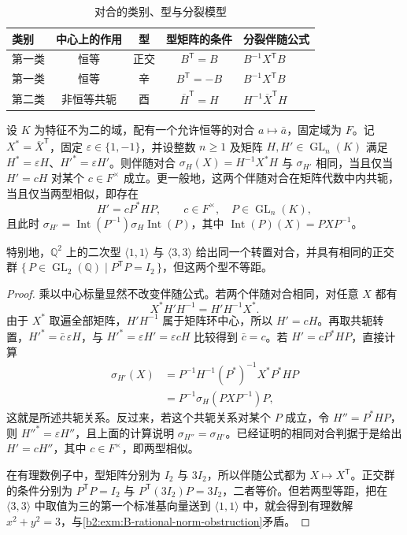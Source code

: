 \begin{table}[htbp]
	\centering
	\caption{对合的类别、型与分裂模型}
	\label{b2:tab:B-involution-kinds}
	\begin{tabular}{lcccl}
		\toprule
		类别 & 中心上的作用 & 型 & 型矩阵的条件 & 分裂伴随公式 \\
		\midrule
		第一类 & 恒等 & 正交 & \(B^{\mathsf T}=B\) & \(B^{-1}X^{\mathsf T}B\) \\
		第一类 & 恒等 & 辛 & \(B^{\mathsf T}=-B\) & \(B^{-1}X^{\mathsf T}B\) \\
		第二类 & 非恒等共轭 & 酉 & \(\overline H^{\mathsf T}=H\) & \(H^{-1}\overline X^{\mathsf T}H\) \\
		\bottomrule
	\end{tabular}
\end{table}

\begin{proposition}\label{b2:prop:B-similar-forms-adjoint}
	设 \(K\) 为特征不为二的域，配有一个允许恒等的对合 \(a\mapsto\bar a\)，固定域为 \(F\)。记 \(X^*=\overline X^{\mathsf T}\)，固定 \(\varepsilon\in\{1,-1\}\)，并设整数 \(n\ge1\) 及矩阵 \(H,H'\in\operatorname{GL}_n(K)\) 满足 \(H^*=\varepsilon H\)、\(H'^*=\varepsilon H'\)。则伴随对合 \(\sigma_H(X)=H^{-1}X^*H\) 与 \(\sigma_{H'}\) 相同，当且仅当 \(H'=cH\) 对某个 \(c\in F^\times\) 成立。更一般地，这两个伴随对合在矩阵代数中内共轭，当且仅当两型相似，即存在
	\[
		H'=cP^*HP,\qquad c\in F^\times,\quad P\in\operatorname{GL}_n(K),
	\]
	且此时 \(\sigma_{H'}=\operatorname{Int}(P^{-1})\sigma_H\operatorname{Int}(P)\)，其中 \(\operatorname{Int}(P)(X)=PXP^{-1}\)。

	特别地，\(\mathbb Q^2\) 上的二次型 \(\langle1,1\rangle\) 与 \(\langle3,3\rangle\) 给出同一个转置对合，并具有相同的正交群 \(\{\,P\in\operatorname{GL}_2(\mathbb Q)\mid P^{\mathsf T}P=I_2\,\}\)，但这两个型不等距。
\end{proposition}
\begin{proof}
	乘以中心标量显然不改变伴随公式。若两个伴随对合相同，对任意 \(X\) 都有
	\[
		X^*H'H^{-1}=H'H^{-1}X^*.
	\]
	由于 \(X^*\) 取遍全部矩阵，\(H'H^{-1}\) 属于矩阵环中心，所以 \(H'=cH\)。再取共轭转置，\(H'^*=\bar c\,\varepsilon H\)，与 \(H'^*=\varepsilon H'=\varepsilon cH\) 比较得到 \(\bar c=c\)。若 \(H'=cP^*HP\)，直接计算
	\[
		\begin{aligned}
			\sigma_{H'}(X) &=P^{-1}H^{-1}(P^*)^{-1}X^*P^*HP\\
			&=P^{-1}\sigma_H(PXP^{-1})P,
		\end{aligned}
	\]
	这就是所述共轭关系。反过来，若这个共轭关系对某个 \(P\) 成立，令 \(H''=P^*HP\)，则 \(H''^*=\varepsilon H''\)，且上面的计算说明 \(\sigma_{H''}=\sigma_{H'}\)。已经证明的相同对合判据于是给出 \(H'=cH''\)，其中 \(c\in F^\times\)，即两型相似。

	在有理数例子中，型矩阵分别为 \(I_2\) 与 \(3I_2\)，所以伴随公式都为 \(X\mapsto X^{\mathsf T}\)。正交群的条件分别为 \(P^{\mathsf T}P=I_2\) 与 \(P^{\mathsf T}(3I_2)P=3I_2\)，二者等价。但若两型等距，把在 \(\langle3,3\rangle\) 中取值为三的第一个标准基向量送到 \(\langle1,1\rangle\) 中，就会得到有理数解 \(x^2+y^2=3\)，与\cref{b2:exm:B-rational-norm-obstruction}矛盾。
\end{proof}

